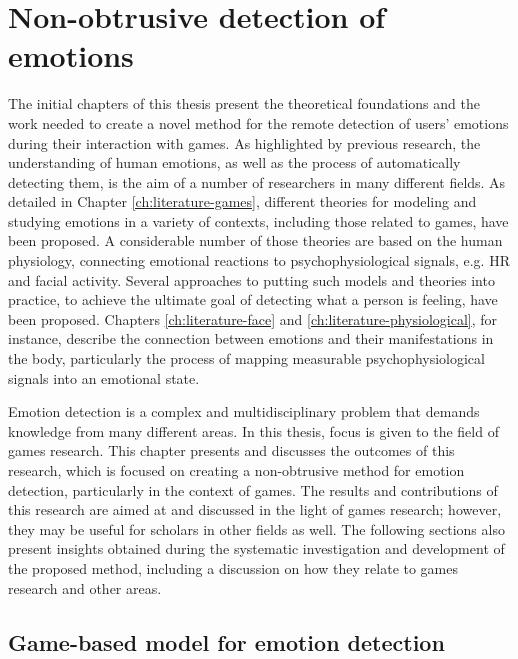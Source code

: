 \chapter{Non-obtrusive detection of emotions}
\label{ch:discussion}

The initial chapters of this thesis present the theoretical foundations and the work needed to create a novel method for the remote detection of users' emotions during their interaction with games. As highlighted by previous research, the understanding of human emotions, as well as the process of automatically detecting them, is the aim of a number of researchers in many different fields. As detailed in Chapter \ref{ch:literature-games}, different theories for modeling and studying emotions in a variety of contexts, including those related to games, have been proposed. A considerable number of those theories are based on the human physiology, connecting emotional reactions to psychophysiological signals, e.g. HR and facial activity. Several approaches to putting such models and theories into practice, to achieve the ultimate goal of detecting what a person is feeling, have been proposed. Chapters \ref{ch:literature-face} and \ref{ch:literature-physiological}, for instance, describe the connection between emotions and their manifestations in the body, particularly the process of mapping measurable psychophysiological signals into an emotional state.

Emotion detection is a complex and multidisciplinary problem that demands knowledge from many different areas. In this thesis, focus is given to the field of games research. This chapter presents and discusses the outcomes of this research, which is focused on creating a non-obtrusive method for emotion detection, particularly in the context of games. The results and contributions of this research are aimed at and discussed in the light of games research; however, they may be useful for scholars in other fields as well. The following sections also present insights obtained during the systematic investigation and development of the proposed method, including a discussion on how they relate to games research and other areas.

\section{\nohyphens{Game-based model for emotion detection}}

